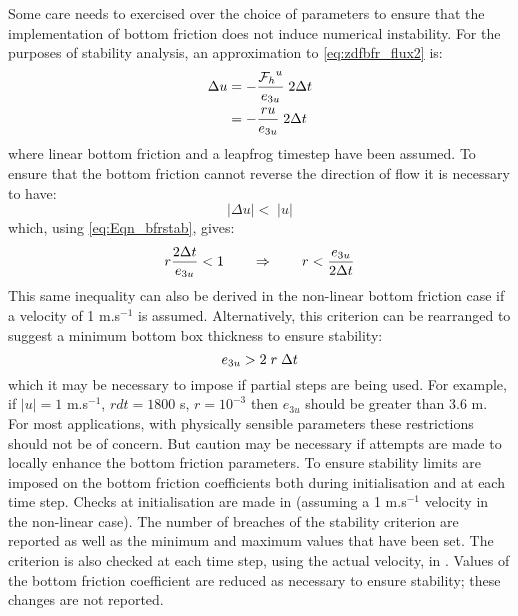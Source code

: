 \documentclass[../tex_main/NEMO_manual]{subfiles}
\begin{document}
Some care needs to exercised over the choice of parameters to ensure that the
implementation of bottom friction does not induce numerical instability. For 
the purposes of stability analysis, an approximation to \autoref{eq:zdfbfr_flux2}
is:
\begin{equation} \label{eq:Eqn_bfrstab}
\begin{split}
 \Delta u &= -\frac{{{\cal F}_h}^u}{e_{3u}}\;2 \Delta t    \\
               &= -\frac{ru}{e_{3u}}\;2\Delta t\\
\end{split}
\end{equation}
\noindent where linear bottom friction and a leapfrog timestep have been assumed. 
To ensure that the bottom friction cannot reverse the direction of flow it is necessary to have:
\begin{equation}
 |\Delta u| < \;|u| 
\end{equation}
\noindent which, using \autoref{eq:Eqn_bfrstab}, gives:
\begin{equation}
r\frac{2\Delta t}{e_{3u}} < 1 \qquad  \Rightarrow \qquad r < \frac{e_{3u}}{2\Delta t}\\
\end{equation}
This same inequality can also be derived in the non-linear bottom friction case 
if a velocity of 1 m.s$^{-1}$ is assumed. Alternatively, this criterion can be 
rearranged to suggest a minimum bottom box thickness to ensure stability:
\begin{equation}
e_{3u} > 2\;r\;\Delta t
\end{equation}
\noindent which it may be necessary to impose if partial steps are being used. 
For example, if $|u| = 1$ m.s$^{-1}$, $rdt = 1800$ s, $r = 10^{-3}$ then
$e_{3u}$ should be greater than 3.6 m. For most applications, with physically
sensible parameters these restrictions should not be of concern. But 
caution may be necessary if attempts are made to locally enhance the bottom
friction parameters. 
To ensure stability limits are imposed on the bottom friction coefficients both during 
initialisation and at each time step. Checks at initialisation are made in  
(assuming a 1 m.s$^{-1}$ velocity in the non-linear case).
The number of breaches of the stability criterion are reported as well as the minimum 
and maximum values that have been set. The criterion is also checked at each time step, 
using the actual velocity, in . Values of the bottom friction coefficient are 
reduced as necessary to ensure stability; these changes are not reported.
\end{document}
